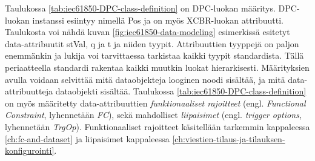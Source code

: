 Taulukossa \ref{tab:iec61850-DPC-class-definition} on DPC-luokan määritys. DPC-luokan instanssi esiintyy nimellä Pos ja on myös XCBR-luokan attribuutti. Taulukosta voi nähdä kuvan \ref{fig:iec61850-data-modeling} esimerkissä esitetyt data-attribuutit stVal, q ja t ja niiden tyypit. Attribuuttien tyyppejä on paljon enemmänkin ja lukija voi tarvittaessa tarkistaa kaikki tyypit standardista. Tällä periaatteella standardi rakentaa kaikki muutkin luokat hierarkisesti. Määrityksien avulla voidaan selvittää mitä dataobjekteja looginen noodi sisältää, ja mitä data-attribuutteja dataobjekti sisältää. Taulukossa \ref{tab:iec61850-DPC-class-definition} on myös määritetty data-attribuuttien \emph{funktionaaliset rajoitteet} (engl. \emph{Functional Constraint}, lyhennetään \emph{FC}), sekä mahdolliset \emph{liipaisimet} (engl. \emph{trigger options}, lyhennetään \emph{TrgOp}). Funktionaaliset rajoitteet käsitellään tarkemmin kappaleessa \ref{ch:fc-and-dataset} ja liipaisimet kappaleessa \ref{ch:viestien-tilaus-ja-tilauksen-konfigurointi}.

